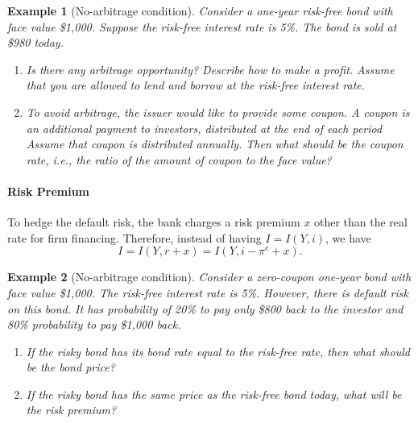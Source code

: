 \documentclass[12pt]{article}
\newtheorem{example}{Example}
\begin{document}
\begin{example}[No-arbitrage condition]
    Consider a one-year risk-free bond with face value \$1,000. Suppose the risk-free interest rate is 5\%. The bond is sold at \$980 today.
    \begin{enumerate}[label=(\arabic*)]
        \item Is there any arbitrage opportunity? Describe how to make a profit. Assume that you are allowed to lend and borrow at the risk-free interest rate.
        \item To avoid arbitrage, the issuer would like to provide some coupon. A coupon is an additional payment to investors, distributed at the end of each period Assume that coupon is distributed annually. Then what should be the coupon rate, i.e., the ratio of the amount of coupon to the face value?
    \end{enumerate}
\end{example}


\paragraph{Risk Premium}
To hedge the default risk, the bank charges a risk premium $x$ other than the real rate for firm financing. Therefore, instead of having $I = I(Y,i)$, we have
\[ I = I (Y, r+x) = I(Y, i-\pi^e+x).\]

\begin{example}[No-arbitrage condition]
    Consider a zero-coupon one-year bond with face value \$1,000. The risk-free interest rate is 5\%. However, there is default risk on this bond. It has probability of 20\% to pay only \$800 back to the investor and 80\% probability to pay \$1,000 back. 
    \begin{enumerate}[label=(\arabic*)]
        \item If the risky bond has its bond rate equal to the risk-free rate, then what should be the bond price?
        \item If the risky bond has the same price as the risk-free bond today, what will be the risk premium?
    \end{enumerate}
\end{example}
\end{document}

